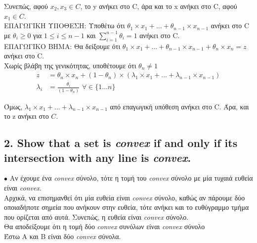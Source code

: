 \documentclass[12pt]{article}
\newcommand{\margin}{\hspace{4pt}}
\begin{document}
Συνεπώς, αφού $x_2, x_3 \in C$, το y ανήκει στο C, άρα και το x ανήκει στο C, αφού $x_1 \in C$. \\

ΕΠΑΓΩΓΙΚΗ ΥΠΟΘΕΣΗ: Υποθέτω ότι $θ_1 \times x_1 + ... + θ_{n-1} \times x_{n-1}$ ανήκει στο C με $θ_i \geq 0$ για $1 \leq i \leq n-1$ και $ \sum_{i=1}^{n-1}θ_i = 1 $ ανήκει στο C. \\

ΕΠΑΓΩΓΙΚΟ ΒΗΜΑ: Θα δείξουμε ότι $θ_1 \times x_1 + ... + θ_{n-1} \times x_{n-1} + θ_n \times x_n = z$ ανήκει στο C. \\

Χωρίς βλάβη της γενικότητας, υποθέτουμε ότι $θ_n \neq 1$\\

\begin{align*}
    z & = θ_n \times x_n + (1 - θ_n) \times (λ_1 \times x_1 + ... + λ_{n-1} \times x_{n-1}) \\
    λ_i & = \frac{θ_i}{(1 - θ_n)} \margin \forall \in \lbrace 1 \dotsc n \rbrace
\end{align*}

Όμως, $λ_1 \times x_1 + ... + λ_{n-1} \times x_{n-1}$ από επαγωγική υπόθεση ανήκει στο C. Άρα, και το z ανήκει στο $C$.

\vspace{2in}

\pagebreak

\subsection*{2. Show that a set is \textit{convex} if and only if its intersection with any line is \textit{convex}.}

$\bullet$ Αν έχουμε ένα \textit{convex} σύνολο, τότε η τομή του \textit{convex} σύνολο με μία τυχαιά ευθεία είναι \textit{convex}. \\

Αρχικά, να επισημανθεί ότι μία ευθεία είναι \textit{convex} σύνολο,
καθώς αν πάρουμε δύο οποιαδήποτε σημεία που ανήκουν στην ευθεία,
τότε ανήκει και το ευθύγραμμο τμήμα που ορίζεται από αυτά.
Συνεπώς, η ευθεία είναι \textit{convex} σύνολο. \\

Θα αποδείξουμε ότι η τομή δύο \textit{convex} συνόλων είναι \textit{convex} σύνολο \\

Έστω Α και Β είναι δύο \textit{convex} σύνολα. \\
\end{document}
